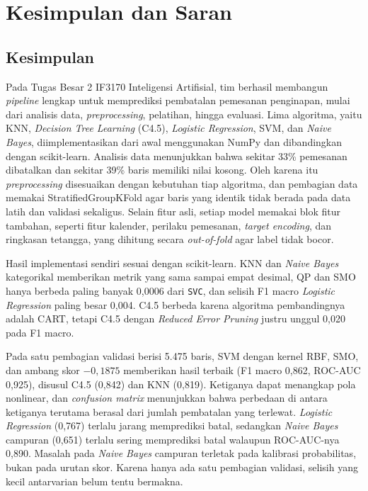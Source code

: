 \clearpage
\section{Kesimpulan dan Saran}

\subsection{Kesimpulan}

Pada Tugas Besar 2 IF3170 Inteligensi Artifisial, tim berhasil membangun \textit{pipeline} lengkap untuk
memprediksi pembatalan pemesanan penginapan, mulai dari analisis data,
\textit{preprocessing}, pelatihan, hingga evaluasi. Lima algoritma, yaitu KNN,
\textit{Decision Tree Learning} (C4.5), \textit{Logistic Regression}, SVM, dan
\textit{Naive Bayes}, diimplementasikan dari awal menggunakan NumPy dan
dibandingkan dengan scikit-learn. Analisis data menunjukkan bahwa sekitar 33\% pemesanan
dibatalkan dan sekitar 39\% baris memiliki nilai kosong. Oleh karena itu
\textit{preprocessing} disesuaikan dengan kebutuhan tiap algoritma, dan
pembagian data memakai StratifiedGroupKFold agar baris yang identik
tidak berada pada data latih dan validasi sekaligus. Selain fitur asli, setiap
model memakai blok fitur tambahan, seperti fitur kalender, perilaku pemesanan,
\textit{target encoding}, dan ringkasan tetangga, yang dihitung secara
\textit{out-of-fold} agar label tidak bocor.

Hasil implementasi sendiri sesuai dengan scikit-learn. KNN dan
\textit{Naive Bayes} kategorikal memberikan metrik yang sama sampai empat
desimal, QP dan SMO hanya berbeda paling banyak 0,0006 dari \texttt{SVC}, dan
selisih F1 macro \textit{Logistic Regression} paling besar 0,004. C4.5 berbeda
karena algoritma pembandingnya adalah CART, tetapi C4.5 dengan
\textit{Reduced Error Pruning} justru unggul 0,020 pada F1 macro.

Pada satu pembagian validasi berisi 5.475 baris, SVM dengan kernel RBF,
SMO, dan ambang skor $-0{,}1875$ memberikan hasil terbaik (F1 macro 0,862,
ROC-AUC 0,925), disusul C4.5 (0,842) dan KNN (0,819). Ketiganya dapat
menangkap pola nonlinear, dan \textit{confusion matrix} menunjukkan bahwa
perbedaan di antara ketiganya terutama berasal dari jumlah pembatalan yang
terlewat. \textit{Logistic Regression} (0,767) terlalu jarang memprediksi
batal, sedangkan \textit{Naive Bayes} campuran (0,651) terlalu sering
memprediksi batal walaupun ROC-AUC-nya 0,890. Masalah pada \textit{Naive Bayes}
campuran terletak pada kalibrasi probabilitas, bukan pada urutan skor.
Karena hanya ada satu pembagian validasi, selisih yang kecil antarvarian
belum tentu bermakna.

